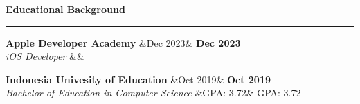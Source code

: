 \documentclass{article}
\newcommand{\header}[1]{
	\vspace{4mm}
	{\large \noindent \textbf{#1}}
	\vspace{1mm}
	\hrule
	\vspace{2mm}
}
\newcommand{\shortitem}[4]{
	\begin{adjustwidth}{}{}
		\textbf{#1} \hfill \ifx&#2& \else \textbf{#2} \fi \\
		\textit{#3} \ifx&#4& \else \hfill #4 \fi
	\end{adjustwidth}
	\vspace{1mm}
}
\begin{document}
\begin{multicols}{2}
		\header{Educational Background}
			\shortitem{Apple Developer Academy}{Dec 2023}{iOS Developer}{}
			\shortitem{Indonesia Univesity of Education}{Oct 2019}{Bachelor of Education in Computer Science}{GPA: 3.72}

	\end{multicols}
\end{document}
